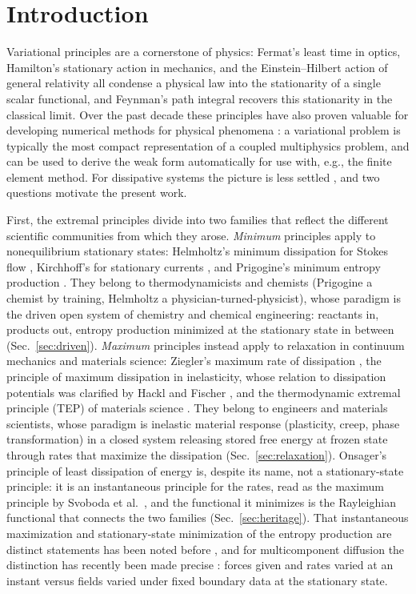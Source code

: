 \documentclass[aip,pof,reprint,amsmath,amssymb,longbibliography]{revtex4-2}
\begin{document}
\section{Introduction}

Variational principles are a cornerstone of physics: Fermat's least time in optics, Hamilton's stationary action in mechanics, and the Einstein--Hilbert action of general relativity all condense a physical law into the stationarity of a single scalar functional, and Feynman's path integral recovers this stationarity in the classical limit. Over the past decade these principles have also proven valuable for developing numerical methods for physical phenomena \cite{flachberger2024, beronvera2021}: a variational problem is typically the most compact representation of a coupled multiphysics problem, and can be used to derive the weak form automatically for use with, e.g., the finite element method. For dissipative systems the picture is less settled \cite{martyushev2006}, and two questions motivate the present work.

First, the extremal principles divide into two families that reflect the different scientific communities from which they arose. \textit{Minimum} principles apply to nonequilibrium stationary states: Helmholtz's minimum dissipation for Stokes flow \cite{helmholtz1868}, Kirchhoff's for stationary currents \cite{kirchhoff1848}, and Prigogine's minimum entropy production \cite{kondepudi2014modern}. They belong to thermodynamicists and chemists (Prigogine a chemist by training, Helmholtz a physician-turned-physicist), whose paradigm is the driven open system of chemistry and chemical engineering: reactants in, products out, entropy production minimized at the stationary state in between (Sec.~\ref{sec:driven}). \textit{Maximum} principles instead apply to relaxation in continuum mechanics and materials science: Ziegler's maximum rate of dissipation \cite{ziegler1963}, the principle of maximum dissipation in inelasticity, whose relation to dissipation potentials was clarified by Hackl and Fischer \cite{hackl2008}, and the thermodynamic extremal principle (TEP) of materials science \cite{svoboda2005application, fischer2014review}. They belong to engineers and materials scientists, whose paradigm is inelastic material response (plasticity, creep, phase transformation) in a closed system releasing stored free energy at frozen state through rates that maximize the dissipation (Sec.~\ref{sec:relaxation}). Onsager's principle of least dissipation of energy \cite{onsager1931reciprocal} is, despite its name, not a stationary-state principle: it is an instantaneous principle for the rates, read as the maximum principle by Svoboda et al.\ \cite{svoboda2023note}, and the functional it minimizes is the Rayleighian functional that connects the two families (Sec.~\ref{sec:heritage}). That instantaneous maximization and stationary-state minimization of the entropy production are distinct statements has been noted before \cite{struchtrup1998, polettini2013}, and for multicomponent diffusion the distinction has recently been made precise \cite{svoboda2023note}: forces given and rates varied at an instant versus fields varied under fixed boundary data at the stationary state.
\end{document}
